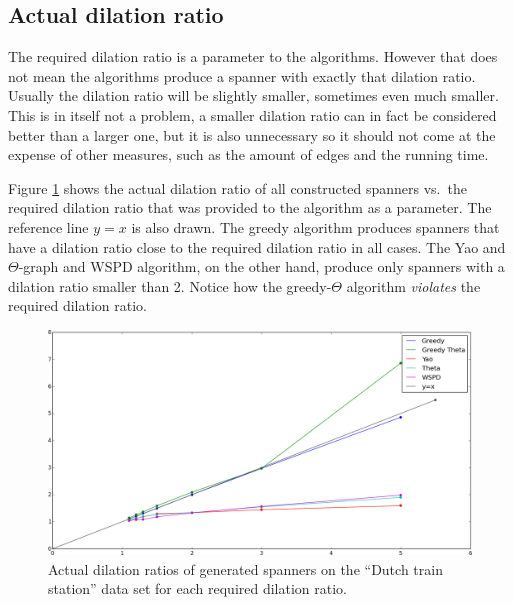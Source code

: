 \documentclass[a4paper,twoside,11pt,hidelinks]{article}
\theoremstyle{plain}
\theoremstyle{definition}  %
\begin{document}
\subsection{Actual dilation ratio}
\label{sec:results:dilation}

The required dilation ratio is a parameter to the algorithms. However that does not mean the algorithms produce a spanner with exactly that dilation ratio. Usually the dilation ratio will be slightly smaller, sometimes even much smaller. This is in itself not a problem, a smaller dilation ratio can in fact be considered better than a larger one, but it is also unnecessary so it should not come at the expense of other measures, such as the amount of edges and the running time.

Figure \ref{fig:actual_vs_required_dilation} shows the actual dilation ratio of all constructed spanners vs.\ the required dilation ratio that was provided to the algorithm as a parameter. The reference line $y = x$ is also drawn. The greedy algorithm produces spanners that have a dilation ratio close to the required dilation ratio in all cases. The Yao and $\Theta$-graph and WSPD algorithm, on the other hand, produce only spanners with a dilation ratio smaller than 2. Notice how the greedy-$\Theta$ algorithm \emph{violates} the required dilation ratio.

\begin{figure}[h]
    \centering
    \includegraphics[width=\textwidth]{figures/actual_dilation_vs_required}
    \caption{Actual dilation ratios of generated spanners on the ``Dutch train station'' data set for each required dilation ratio.}
    \label{fig:actual_vs_required_dilation}
\end{figure}
\end{document}
